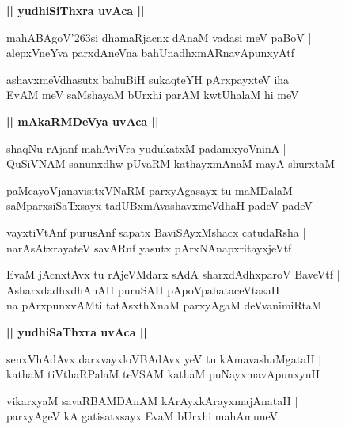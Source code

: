 \documentclass[twoside,12pt,openright]{book}
\def\S{\char'263}
\newcounter{shloka}[chapter]
\def\uvaca#1{\centerline{{\large\textbf{#1}}}}
\begin{document}
\uvaca{|| yudhiSiThxra uvAca ||}

\begin{shloka}
mahABAgoV\S si dhamaRjacnx dAnaM vadasi meV paBoV |\\
alepxVneYva parxdAneVna bahUnadhxmARnavApunxyAtf 
\end{shloka}

\begin{shloka}
ashavxmeVdhasutx bahuBiH sukaqteYH pArxpayxteV iha |\\
EvAM meV saMshayaM bUrxhi parAM kwtUhalaM hi meV  
\end{shloka}

\uvaca{|| mAkaRMDeVya uvAca ||}

\begin{shloka}
shaqNu rAjanf mahAviVra yudukatxM padamxyoVninA |\\
QuSiVNAM sanunxdhw pUvaRM kathayxmAnaM mayA shurxtaM 
\end{shloka}

\begin{shloka}
paMcayoVjanavisitxVNaRM parxyAgasayx tu maMDalaM |\\
saMparxsiSaTxsayx tadUBxmAvashavxmeVdhaH padeV padeV 
\end{shloka}

\begin{shloka}
vayxtiVtAnf purusAnf sapatx BaviSAyxMshacx catudaRsha |\\
narAsAtxrayateV savARnf yasutx pArxNAnapxritayxjeVtf 
\end{shloka}

\begin{shloka}
EvaM jAcnxtAvx tu rAjeVMdarx sAdA sharxdAdhxparoV BaveVtf |\\
AsharxdadhxdhAnAH puruSAH pApoVpahataceVtasaH \\
na pArxpunxvAMti tatAsxthXnaM parxyAgaM deVvanimiRtaM 
\end{shloka}

\uvaca{|| yudhiSaThxra uvAca ||}

\begin{shloka}
senxVhAdAvx darxvayxloVBAdAvx yeV tu kAmavashaMgataH |\\
kathaM tiVthaRPalaM teVSAM kathaM puNayxmavApunxyuH 
\end{shloka}

\begin{shloka}
vikarxyaM savaRBAMDAnAM kArAyxkArayxmajAnataH |\\
parxyAgeV kA gatisatxsayx EvaM bUrxhi mahAmuneV 
\end{shloka}
\end{document}
